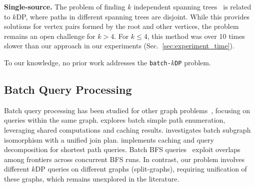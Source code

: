 \textbf{Single-source.} 
The problem of finding $k$ independent spanning trees~\cite{2009BRTree, four_independent_spanning, IST_survey} is related to $k$DP, where paths in different spanning trees are disjoint. While this provides solutions for vertex pairs formed by the root and other vertices, the problem remains an open challenge for $k>4$. For $k\le 4$, this method was over 10 times slower than our approach in our experiments (Sec.~\ref{sec:experiment_time}).

To our knowledge, no prior work addresses the \texttt{batch-$k$DP} problem.

\subsection{Batch Query Processing} \label{sec:related_batch}
Batch query processing has been studied for other graph problems~\cite{BatchEnum, tods21subgraphiso, icde20shortestpath, msbfs}, focusing on queries within the same graph.
\cite{BatchEnum} explores batch simple path enumeration, leveraging shared computations and caching results. \cite{tods21subgraphiso} investigates batch subgraph isomorphism with a unified join plan. \cite{icde20shortestpath} implements caching and query decomposition for shortest path queries. Batch BFS queries~\cite{msbfs} exploit overlaps among frontiers across concurrent BFS runs.
In contrast, our problem involves different $k$DP queries on different graphs (split-graphs), requiring unification of these graphs, which remains unexplored in the literature.
